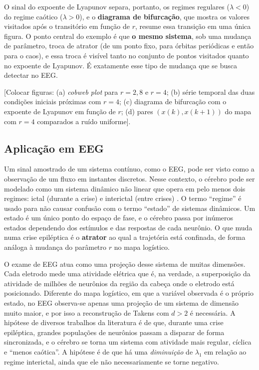 \documentclass[]{article}
\begin{document}
	O sinal do expoente de Lyapunov separa, portanto, os regimes regulares ($\lambda < 0$) do regime caótico ($\lambda > 0$), e o \textbf{diagrama de bifurcação}, que mostra os valores visitados após o transitório em função de $r$, resume essa transição em uma única figura. O ponto central do exemplo é que \textbf{o mesmo sistema}, sob uma mudança de parâmetro, troca de atrator (de um ponto fixo, para órbitas periódicas e então para o caos), e essa troca é visível tanto no conjunto de pontos visitados quanto no expoente de Lyapunov. É exatamente esse tipo de mudança que se busca detectar no EEG.

	[Colocar figuras: (a) \textit{cobweb plot} para $r = 2{,}8$ e $r = 4$; (b) série temporal das duas condições iniciais próximas com $r = 4$; (c) diagrama de bifurcação com o expoente de Lyapunov em função de $r$; (d) pares $(x(k), x(k+1))$ do mapa com $r = 4$ comparados a ruído uniforme].

	\subsection{Aplicação em EEG}
	\label{subsec:caos_eeg}
	\noindent

	Um sinal amostrado de um sistema contínuo, como o EEG, pode ser visto como a observação de um fluxo em instantes discretos. Nesse contexto, o cérebro pode ser modelado como um sistema dinâmico não linear que opera em pelo menos dois regimes: ictal (durante a crise) e interictal (entre crises) \cite{iasemidis1990phase, lehnertz1998can}. O termo ``regime'' é usado para não causar confusão com o termo ``estado'' de sistemas dinâmicos. Um estado é um único ponto do espaço de fase, e o cérebro passa por inúmeros estados dependendo dos estímulos e das respostas de cada neurônio. O que muda numa crise epiléptica é o \textbf{atrator} ao qual a trajetória está confinada, de forma análoga à mudança do parâmetro $r$ no mapa logístico.

	O exame de EEG atua como uma projeção desse sistema de muitas dimensões. Cada eletrodo mede uma atividade elétrica que é, na verdade, a superposição da atividade de milhões de neurônios da região da cabeça onde o eletrodo está posicionado. Diferente do mapa logístico, em que a variável observada é o próprio estado, no EEG observa-se apenas uma projeção de um sistema de dimensão muito maior, e por isso a reconstrução de Takens com $d > 2$ é necessária. A hipótese de diversos trabalhos da literatura \cite{iasemidis1990phase, lehnertz1998can, zabihi2015analysis} é de que, durante uma crise epiléptica, grandes populações de neurônios passam a disparar de forma sincronizada, e o cérebro se torna um sistema com atividade mais regular, cíclica e ``menos caótica''. A hipótese é de que há uma \emph{diminuição} de $\lambda_1$ em relação ao regime interictal, ainda que ele não necessariamente se torne negativo.
\end{document}
